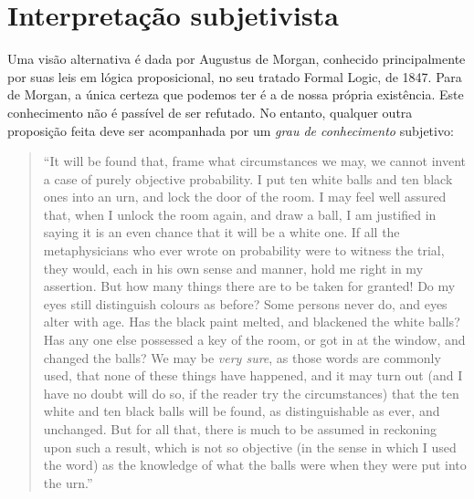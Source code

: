 \section{Interpretação subjetivista}
Uma visão alternativa é dada por Augustus de Morgan, conhecido principalmente por suas leis em lógica proposicional, 
no seu tratado Formal Logic, de 1847. Para de Morgan, a única certeza que podemos ter é a de nossa própria existência. 
Este conhecimento
não é passível de ser refutado. No entanto, qualquer outra proposição feita deve ser acompanhada por 
um {\em grau de conhecimento} subjetivo:

\begin{quote}
``It will be found that, frame what circumstances we may, we cannot invent a case of purely objective probability.
I put ten white balls and ten black ones into an urn, and lock the door of the room. I may feel well assured that,
when I unlock the room again, and draw a ball, I am justified in saying it is an even chance that it will be a white one.
If all the metaphysicians who ever wrote on probability were to witness the trial, they would, each in his own sense and 
manner, hold me right in my assertion. But how many things there are to be taken for granted! Do my eyes still distinguish
colours as before? Some persons never do, and eyes alter with age. Has the black paint melted, and blackened the white balls?
Has any one else possessed a key of the room, or got in at the window, and changed the balls? We may be {\em very sure},
as those words are commonly used, that none of these things have happened, and it may turn out (and I have no doubt will do so,
if the reader try the circumstances) that the ten white and ten black balls will be found, as distinguishable as ever, and
unchanged. But for all that, there is much to be assumed in reckoning upon such a result, which is not so objective (in the
sense in which I used the word) as the knowledge of what the balls were when they were put into the urn.'' \citep{deMorgan1847}
\end{quote}

